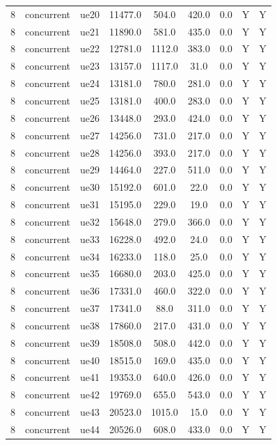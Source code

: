 \begin{table}[ht]
\begin{tabular}{|c|c|c|c|c|c|c|c|c|}
8 & concurrent & ue20 & 11477.0 & 504.0 & 420.0 & 0.0 & Y & Y \\
8 & concurrent & ue21 & 11890.0 & 581.0 & 435.0 & 0.0 & Y & Y \\
8 & concurrent & ue22 & 12781.0 & 1112.0 & 383.0 & 0.0 & Y & Y \\
8 & concurrent & ue23 & 13157.0 & 1117.0 & 31.0 & 0.0 & Y & Y \\
8 & concurrent & ue24 & 13181.0 & 780.0 & 281.0 & 0.0 & Y & Y \\
8 & concurrent & ue25 & 13181.0 & 400.0 & 283.0 & 0.0 & Y & Y \\
8 & concurrent & ue26 & 13448.0 & 293.0 & 424.0 & 0.0 & Y & Y \\
8 & concurrent & ue27 & 14256.0 & 731.0 & 217.0 & 0.0 & Y & Y \\
8 & concurrent & ue28 & 14256.0 & 393.0 & 217.0 & 0.0 & Y & Y \\
8 & concurrent & ue29 & 14464.0 & 227.0 & 511.0 & 0.0 & Y & Y \\
8 & concurrent & ue30 & 15192.0 & 601.0 & 22.0 & 0.0 & Y & Y \\
8 & concurrent & ue31 & 15195.0 & 229.0 & 19.0 & 0.0 & Y & Y \\
8 & concurrent & ue32 & 15648.0 & 279.0 & 366.0 & 0.0 & Y & Y \\
8 & concurrent & ue33 & 16228.0 & 492.0 & 24.0 & 0.0 & Y & Y \\
8 & concurrent & ue34 & 16233.0 & 118.0 & 25.0 & 0.0 & Y & Y \\
8 & concurrent & ue35 & 16680.0 & 203.0 & 425.0 & 0.0 & Y & Y \\
8 & concurrent & ue36 & 17331.0 & 460.0 & 322.0 & 0.0 & Y & Y \\
8 & concurrent & ue37 & 17341.0 & 88.0 & 311.0 & 0.0 & Y & Y \\
8 & concurrent & ue38 & 17860.0 & 217.0 & 431.0 & 0.0 & Y & Y \\
8 & concurrent & ue39 & 18508.0 & 508.0 & 442.0 & 0.0 & Y & Y \\
8 & concurrent & ue40 & 18515.0 & 169.0 & 435.0 & 0.0 & Y & Y \\
8 & concurrent & ue41 & 19353.0 & 640.0 & 426.0 & 0.0 & Y & Y \\
8 & concurrent & ue42 & 19769.0 & 655.0 & 543.0 & 0.0 & Y & Y \\
8 & concurrent & ue43 & 20523.0 & 1015.0 & 15.0 & 0.0 & Y & Y \\
8 & concurrent & ue44 & 20526.0 & 608.0 & 433.0 & 0.0 & Y & Y \\

\end{tabular}
\end{table}
